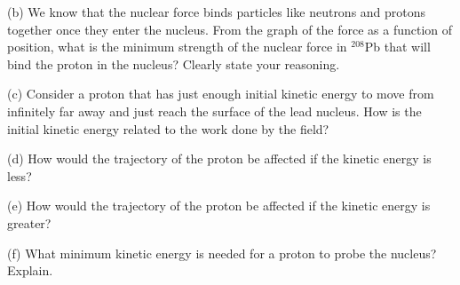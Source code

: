 (b) We know that the nuclear force binds particles like neutrons and
protons together once they enter the nucleus. From the graph of the
force as a function of position, what is the minimum strength of the
nuclear force in \( ^{208} \)Pb that will bind the proton in the
nucleus? Clearly state your reasoning.
\answerspace{12mm}

(c) Consider a proton that has just enough initial kinetic energy
to move from infinitely far away and just reach the surface of the
lead nucleus. How is the initial kinetic energy related to the work
done by the field?
\answerspace{12mm}

(d) How would the trajectory of the proton be affected if the kinetic
energy is less?
\answerspace{12mm}

(e) How would the trajectory of the proton be affected if the kinetic
energy is greater?
\answerspace{12mm}

(f) What minimum kinetic energy is needed for a proton to probe the
nucleus? Explain.
\answerspace{15mm}


